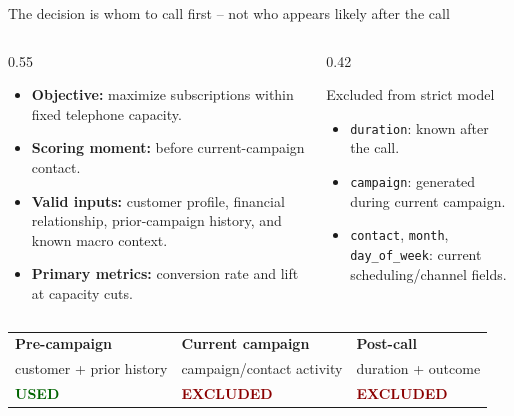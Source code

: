 \documentclass[aspectratio=169,11pt]{beamer}
\newcommand{\tightitem}{\setlength\itemsep{0.25em}}
\begin{document}
\begin{frame}{The decision is whom to call first -- not who appears likely after the call}
\begin{columns}[T,totalwidth=\textwidth]
\begin{column}{0.55\textwidth}
\begin{itemize}\tightitem
  \item \textbf{Objective:} maximize subscriptions within fixed telephone capacity.
  \item \textbf{Scoring moment:} before current-campaign contact.
  \item \textbf{Valid inputs:} customer profile, financial relationship, prior-campaign history, and known macro context.
  \item \textbf{Primary metrics:} conversion rate and lift at capacity cuts.
\end{itemize}
\end{column}
\begin{column}{0.42\textwidth}
\begin{block}{Excluded from strict model}
\begin{itemize}\tightitem
  \item \texttt{duration}: known after the call.
  \item \texttt{campaign}: generated during current campaign.
  \item \texttt{contact}, \texttt{month}, \texttt{day\_of\_week}: current scheduling/channel fields.
\end{itemize}
\end{block}
\end{column}
\end{columns}

\vspace{1.0em}
\centering
\begin{tabularx}{0.94\textwidth}{>{\centering\arraybackslash}X>{\centering\arraybackslash}X>{\centering\arraybackslash}X}
\rowcolor{softblue}
\textbf{Pre-campaign} & \textbf{Current campaign} & \textbf{Post-call} \\
customer + prior history & campaign/contact activity & duration + outcome \\
\textcolor{darkgreen}{\textbf{USED}} & \textcolor{darkred}{\textbf{EXCLUDED}} & \textcolor{darkred}{\textbf{EXCLUDED}} \\
\end{tabularx}
\end{frame}
\end{document}

